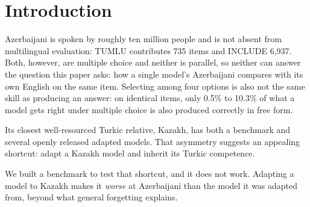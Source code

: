 \documentclass[final]{clv2025}
\begin{document}
\begin{abstract}
The single exception, a Ukrainian-adapted model that does no damage, is
absorbed by a marker that separates all ten pairs without exception: whether
the adapted model begins writing Azerbaijani answers in Cyrillic. Every pair
that emits any Cyrillic is damaged; every pair that emits none is not. We stop
short of calling this the mechanism, because transliteration recovers only part
of the Kazakh damage and almost none of the Russian.

The failure decomposes into two modes with opposite prospects. A Kazakh-adapted
model writes Azerbaijani answers in Cyrillic, and transliteration more than
doubles its score: the knowledge is present and the surface form is wrong. A
Turkish-adapted model writes them in Turkish, which no normalisation repairs
because the alphabet is already correct, and which the standard word-level
language-confusion detector misses in 92\% of cases, since the Turkish alphabet
is a subset of the Azerbaijani one and no character ever leaves the expected
range.
\end{abstract}

\section{Introduction}

Azerbaijani is spoken by roughly ten million people and is not absent from
multilingual evaluation: TUMLU contributes 735 items and INCLUDE 6,937. Both,
however, are multiple choice and neither is parallel, so neither can answer the
question this paper asks: how a single model's Azerbaijani compares with its
own English on the same item. Selecting among four options is also not the same
skill as producing an answer: on identical items, only 0.5\% to 10.3\% of what
a model gets right under multiple choice is also produced correctly in free
form.

Its closest well-resourced Turkic relative, Kazakh, has both a benchmark and
several openly released adapted models. That asymmetry suggests an appealing
shortcut: adapt a Kazakh model and inherit its Turkic competence.

We built a benchmark to test that shortcut, and it does not work. Adapting a
model to Kazakh makes it \emph{worse} at Azerbaijani than the model it was
adapted from, beyond what general forgetting explains.
\end{document}
